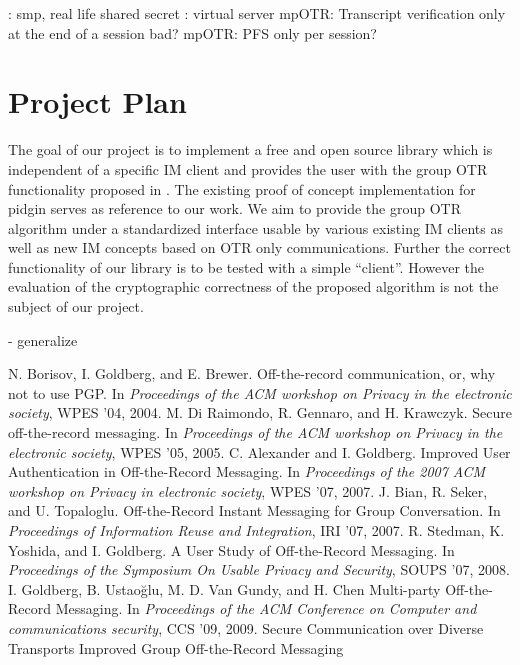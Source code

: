 \cite{auth-otr}: smp, real life shared secret
\cite{gotr}: virtual server
mpOTR: Transcript verification only at the end of a session bad?
mpOTR: PFS only per session?

\section{Project Plan}
The goal of our project is to implement a free and open source library which is independent of a specific IM client and provides the user with the group OTR functionality proposed in \cite{impr-gotr}. The existing proof of concept implementation for pidgin serves as reference to our work. We aim to provide the group OTR algorithm under a standardized interface usable by various existing IM clients as well as new IM concepts based on OTR only communications. Further the correct functionality of our library is to be tested with a simple “client”. However the evaluation of the cryptographic correctness of the proposed algorithm is not the subject of our project.

- generalize

\begin{thebibliography}{xx}
	 N. Borisov, I. Goldberg, and E. Brewer. Off-the-record communication, or, why not to use PGP. In \textit{Proceedings of the ACM workshop on Privacy in the electronic society}, WPES ’04, 2004.
	 M. Di Raimondo, R. Gennaro, and H. Krawczyk. Secure off-the-record messaging. In \textit{Proceedings of the ACM workshop on Privacy in the electronic society}, WPES ’05, 2005.
	 C. Alexander and I. Goldberg. Improved User Authentication in Off-the-Record Messaging. In \textit{Proceedings of the 2007 ACM workshop on Privacy in electronic society}, WPES ’07, 2007.
	 J. Bian, R. Seker, and U. Topaloglu. Off-the-Record Instant Messaging for Group Conversation. In \textit{Proceedings of Information Reuse and Integration}, IRI ’07, 2007.
	 R. Stedman, K. Yoshida, and I. Goldberg. A User Study
		of Off-the-Record Messaging. In \textit{Proceedings of the Symposium On
	Usable Privacy and Security}, SOUPS ’07, 2008.
	 I. Goldberg, B. Ustaoğlu, M. D. Van Gundy, and H. Chen
		Multi-party Off-the-Record Messaging. In \textit{Proceedings of the ACM
		Conference on Computer and communications security}, CCS ’09, 2009.
	 Secure Communication over Diverse Transports
	 Improved Group Off-the-Record Messaging
\end{thebibliography}


